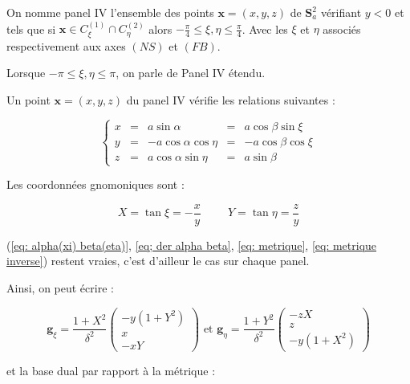 \begin{definition}
On nomme panel IV l'ensemble des points $\mathbf{x}=(x,y,z)$ de $\mathbf{S}_a^2$ vérifiant $y<0$ et tels que si $\mathbf{x} \in C_{\xi}^{(1)} \cap C_{\eta}^{(2)}$ alors $-\frac{\pi}{4}\leq \xi,\eta \leq \frac{\pi}{4}$. Avec les $\xi$ et $\eta$ associés respectivement aux axes $(NS)$ et $(FB)$.

Lorsque $-\pi \leq \xi,\eta \leq \pi$, on parle de Panel IV étendu.
\end{definition}

Un point $\mathbf{x}=(x,y,z)$ du panel IV vérifie les relations suivantes :

\begin{equation}
\left\lbrace
\begin{array}{rcccc}
x & = & a \sin \alpha & = & a \cos \beta \sin \xi \\
y & = & - a \cos \alpha \cos \eta & = & - a \cos \beta \cos \xi \\
z & = & a \cos \alpha \sin \eta & = & a \sin \beta
\end{array}
\right.
\end{equation}

Les coordonnées gnomoniques sont :

\begin{equation}
X = \tan \xi = - \dfrac{x}{y} \hspace{1cm} Y = \tan \eta = \dfrac{z}{y}
\end{equation}

(\ref{eq: alpha(xi) beta(eta)}, \ref{eq; der alpha beta}, \ref{eq: metrique}, \ref{eq: metrique inverse}) restent vraies, c'est d'ailleur le cas sur chaque panel. 

Ainsi, on peut écrire : 

\begin{equation}
\mathbf{g}_{\xi} = \dfrac{1+X^2}{\delta^2} \begin{pmatrix}
-y(1+Y^2) \\ x \\ -xY
\end{pmatrix} \text{ et } \mathbf{g}_{\eta} = \dfrac{1+Y^2}{\delta^2} \begin{pmatrix}
-zX \\ z \\ -y(1+X^2)
\end{pmatrix}
\label{eq: base locale IV}
\end{equation}

et la base dual par rapport à la métrique :

